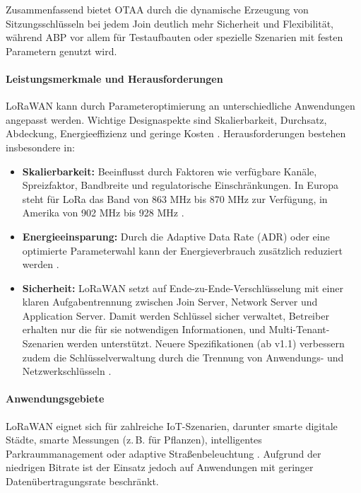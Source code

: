 Zusammenfassend bietet OTAA durch die dynamische Erzeugung von Sitzungsschlüsseln bei jedem Join deutlich mehr Sicherheit und Flexibilität, während ABP vor allem für Testaufbauten oder spezielle Szenarien mit festen Parametern genutzt wird.  

\paragraph*{Leistungsmerkmale und Herausforderungen}
LoRaWAN kann durch Parameteroptimierung an unterschiedliche Anwendungen angepasst werden. Wichtige Designaspekte sind Skalierbarkeit, Durchsatz, Abdeckung, Energieeffizienz und geringe Kosten \cite{bor2017lora}. Herausforderungen bestehen insbesondere in:

\begin{itemize}
    \item \textbf{Skalierbarkeit:} Beeinflusst durch Faktoren wie verfügbare Kanäle, Spreizfaktor, Bandbreite und regulatorische Einschränkungen. In Europa steht für LoRa das Band von 863 MHz bis 870 MHz zur Verfügung, in Amerika von 902 MHz bis 928 MHz \autocite{FrequencyPlans}.
    
    \item \textbf{Energieeinsparung:} Durch die Adaptive Data Rate (ADR) oder eine optimierte Parameterwahl kann der Energieverbrauch zusätzlich reduziert werden \autocite{kufakunesuSurveyAdaptiveData2020}.
    
    \item \textbf{Sicherheit:} LoRaWAN setzt auf Ende-zu-Ende-Verschlüsselung mit einer klaren Aufgabentrennung zwischen Join Server, Network Server und Application Server. Damit werden Schlüssel sicher verwaltet, Betreiber erhalten nur die für sie notwendigen Informationen, und Multi-Tenant-Szenarien werden unterstützt. Neuere Spezifikationen (ab v1.1) verbessern zudem die Schlüsselverwaltung durch die Trennung von Anwendungs- und Netzwerkschlüsseln \autocite{butun2019security,LoRaWANBackendInterfaces11}.
\end{itemize}

\paragraph*{Anwendungsgebiete}
LoRaWAN eignet sich für zahlreiche IoT-Szenarien, darunter smarte digitale Städte, smarte Messungen (z.\,B. für Pflanzen), intelligentes Parkraummanagement oder adaptive Straßenbeleuchtung \autocite{BadenWuerttembergFoerdertLong2024}. Aufgrund der niedrigen Bitrate ist der Einsatz jedoch auf Anwendungen mit geringer Datenübertragungsrate beschränkt.

